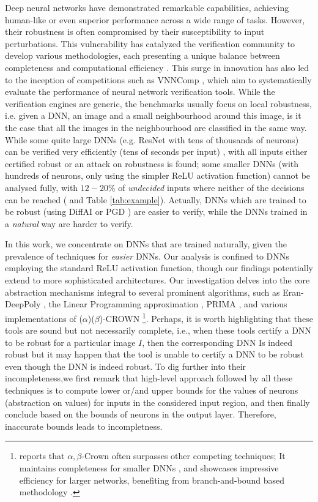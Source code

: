 Deep neural networks have demonstrated remarkable capabilities, achieving \newline human-like or even superior performance across a wide range of tasks. However, their robustness is often compromised by their susceptibility to input perturbations. This vulnerability has catalyzed the verification community to develop various methodologies, each presenting a unique balance between completeness and computational efficiency \cite{katz2019marabou,Reluplex,deeppoly}. This surge in innovation has also led to the inception of competitions such as VNNComp \cite{VNNcomp}, which aim to systematically evaluate the performance of neural network verification tools. While the verification engines are generic, the benchmarks usually focus on local robustness, i.e. given a DNN, an image and a small neighbourhood around this image, 
is it the case that all the images in the neighbourhood are classified in the same way.
While some quite large DNNs (e.g. ResNet with tens of thousands of neurons) can be verified very efficiently (tens of seconds per input) \cite{crown}, with all inputs either certified robust or an attack on robustness is found; some smaller DNNs (with hundreds of neurons, only using the simpler ReLU activation function) cannot be analysed fully, with $12-20\%$ of {\em undecided} inputs where neither of the decisions can be reached (\cite{crown} and Table \ref{tab:example}). Actually, DNNs which are trained to be robust (using DiffAI \cite{DiffAI} or PGD \cite{PGD}) are easier to verify, while the DNNs trained in a {\em natural} way are harder to verify.

In this work, we concentrate on DNNs that are trained naturally, given the prevalence of techniques for {\em easier} DNNs. Our analysis is confined to DNNs employing the standard ReLU activation function, though our findings potentially extend to more sophisticated architectures. Our investigation delves into the core abstraction mechanisms integral to several prominent algorithms, such as Eran-DeepPoly \cite{deeppoly}, the Linear Programming approximation \cite{MILP}, PRIMA \cite{prima}, and various implementations of ($\alpha$)($\beta$)-CROWN \cite{crown,xu2020fast}\footnote{
	\cite{VNNcomp} reports that $\alpha,\beta$-Crown \cite{crown,xu2020fast} often surpasses other competing techniques;  It maintains completeness for smaller DNNs \cite{xu2020fast}, and showcases impressive efficiency for larger networks, benefiting from branch-and-bound based methodology \cite{cutting,BaB}.
}. Perhaps, it is worth highlighting that these tools are  sound but not necessarily complete, i.e., when these tools certify a DNN to be robust for a particular image $I$, then the corresponding DNN Is indeed robust but it may happen that the tool is unable to certify a DNN to be robust even though the DNN is indeed robust. To dig further into their incompleteness,we first remark that high-level approach followed by all these techniques is to compute lower or/and upper bounds for the values of neurons (abstraction on values) for inputs in the considered input region, and then finally conclude based on the bounds of neurons in the output layer. Therefore, inaccurate bounds leads to incompletness. 


